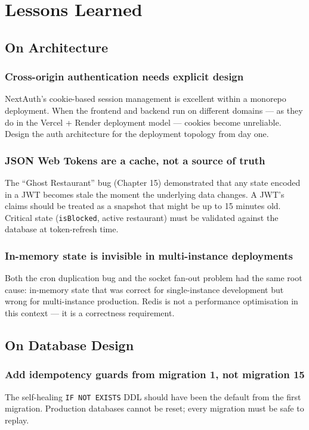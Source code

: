 \documentclass[11pt,a4paper,twoside]{book}
\begin{document}
\chapter{Lessons Learned}

\section{On Architecture}

\subsection{Cross-origin authentication needs explicit design}
NextAuth's cookie-based session management is excellent within a monorepo
deployment.  When the frontend and backend run on different domains — as they do
in the Vercel + Render deployment model — cookies become unreliable.  Design the
auth architecture for the deployment topology from day one.

\subsection{JSON Web Tokens are a cache, not a source of truth}
The ``Ghost Restaurant'' bug (Chapter 15) demonstrated that any state encoded in
a JWT becomes stale the moment the underlying data changes.  A JWT's claims
should be treated as a snapshot that might be up to 15 minutes old.  Critical
state (\texttt{isBlocked}, active restaurant) must be validated against the
database at token-refresh time.

\subsection{In-memory state is invisible in multi-instance deployments}
Both the cron duplication bug and the socket fan-out problem had the same root
cause: in-memory state that was correct for single-instance development but
wrong for multi-instance production.  Redis is not a performance optimisation
in this context — it is a correctness requirement.

\section{On Database Design}

\subsection{Add idempotency guards from migration 1, not migration 15}
The self-healing \texttt{IF NOT EXISTS} DDL should have been the default from
the first migration.  Production databases cannot be reset; every migration must
be safe to replay.
\end{document}

